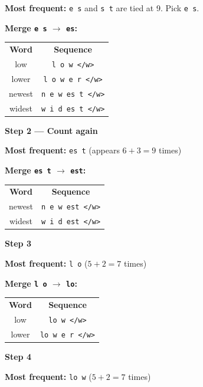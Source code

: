 \noindent\textbf{Most frequent:} \texttt{e s} and \texttt{s t} are tied at 9. Pick \texttt{e s}.

\noindent\textbf{Merge \texttt{e s} $\to$ \texttt{es}:}

\begin{center}
\begin{tabular}{c|c}
\textbf{Word} & \textbf{Sequence} \\
low    & \texttt{l o w </w>} \\
lower  & \texttt{l o w e r </w>} \\
newest & \texttt{n e w es t </w>} \\
widest & \texttt{w i d es t </w>} \\
\end{tabular}
\end{center}

\medskip
\noindent\textbf{Step 2 --- Count again}

\noindent\textbf{Most frequent:} \texttt{es t} (appears $6+3 = 9$ times)

\noindent\textbf{Merge \texttt{es t} $\to$ \texttt{est}:}

\begin{center}
\begin{tabular}{c|c}
\textbf{Word} & \textbf{Sequence} \\
newest & \texttt{n e w est </w>} \\
widest & \texttt{w i d est </w>} \\
\end{tabular}
\end{center}

\medskip
\noindent\textbf{Step 3}

\noindent\textbf{Most frequent:} \texttt{l o} ($5+2 = 7$ times)

\noindent\textbf{Merge \texttt{l o} $\to$ \texttt{lo}:}

\begin{center}
\begin{tabular}{c|c}
\textbf{Word} & \textbf{Sequence} \\
low   & \texttt{lo w </w>} \\
lower & \texttt{lo w e r </w>} \\
\end{tabular}
\end{center}

\medskip
\noindent\textbf{Step 4}

\noindent\textbf{Most frequent:} \texttt{lo w} ($5+2 = 7$ times)

